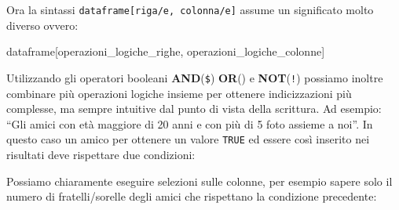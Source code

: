\documentclass[
]{book}
\newenvironment{Shaded}{\begin{snugshade}}{\end{snugshade}}
\newcommand{\CommentTok}[1]{\textcolor[rgb]{0.56,0.35,0.01}{\textit{#1}}}
\newcommand{\DecValTok}[1]{\textcolor[rgb]{0.00,0.00,0.81}{#1}}
\newcommand{\NormalTok}[1]{#1}
\newcommand{\OperatorTok}[1]{\textcolor[rgb]{0.81,0.36,0.00}{\textbf{#1}}}
\newcommand{\StringTok}[1]{\textcolor[rgb]{0.31,0.60,0.02}{#1}}
\begin{document}
Ora la sintassi \texttt{dataframe{[}riga/e,\ colonna/e{]}} assume un significato molto diverso ovvero:

\begin{Shaded}
\begin{Highlighting}[]
\NormalTok{dataframe[operazioni_logiche_righe, operazioni_logiche_colonne]}
\end{Highlighting}
\end{Shaded}

Utilizzando gli operatori booleani \textbf{AND}(\texttt{\$}) \textbf{OR}(\texttt{\textbar{}}) e \textbf{NOT}(\texttt{!}) possiamo inoltre combinare più operazioni logiche insieme per ottenere indicizzazioni più complesse, ma sempre intuitive dal punto di vista della scrittura. Ad esempio: ``Gli amici con età maggiore di 20 anni e con più di 5 foto assieme a noi''. In questo caso un amico per ottenere un valore \texttt{TRUE} ed essere così inserito nei risultati deve rispettare due condizioni:

\begin{Shaded}
\end{Shaded}

Possiamo chiaramente eseguire selezioni sulle colonne, per esempio sapere solo il numero di fratelli/sorelle degli amici che rispettano la condizione precedente:

\begin{Shaded}
\end{Shaded}
\end{document}
